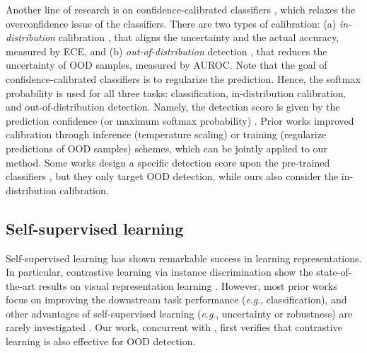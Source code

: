 \documentclass{article}
\newcommand{\eg}{\textit{e}.\textit{g}.}
\begin{document}
Another line of research is on confidence-calibrated classifiers \citep{hendrycks2017baseline}, which relaxes the overconfidence issue of the classifiers. There are two types of calibration: (a) \textit{in-distribution} calibration \citep{naeini2015obtaining, guo2017calibration}, that aligns the uncertainty and the actual accuracy, measured by ECE, and (b) \textit{out-of-distribution} detection \citep{hendrycks2017baseline,lee2018training}, that reduces the uncertainty of OOD samples, measured by AUROC. Note that the goal of confidence-calibrated classifiers is to regularize the prediction. Hence, the softmax probability is used for all three tasks: classification, in-distribution calibration, and out-of-distribution detection. Namely, the detection score is given by the prediction confidence (or maximum softmax probability) \citep{hendrycks2017baseline}. Prior works improved calibration through inference (temperature scaling) \citep{guo2017calibration} or training (regularize predictions of OOD samples) \citep{lee2018training} schemes, which can be jointly applied to our method. Some works design a specific detection score upon the pre-trained classifiers \citep{liang2018enhancing,lee2018simple}, but they only target OOD detection, while ours also consider the in-distribution calibration.


\subsection{Self-supervised learning}

Self-supervised learning \citep{gidaris2018unsupervised,kolesnikov2019revisiting} has shown remarkable success in learning representations. In particular, contrastive learning \citep{falcon2020framework} via instance discrimination \citep{wu2018unsupervised} show the state-of-the-art results on visual representation learning \citep{he2019momentum,chen2020simple}. However, most prior works focus on improving the downstream task performance (\eg, classification), and other advantages of self-supervised learning (\eg, uncertainty or robustness) are rarely investigated \citep{hendrycks2019using_self,kim2020adversarial}. Our work, concurrent with \citep{liu2020hybrid,winkens2020contrastive}, first verifies that contrastive learning is also effective for OOD detection.
\end{document}
